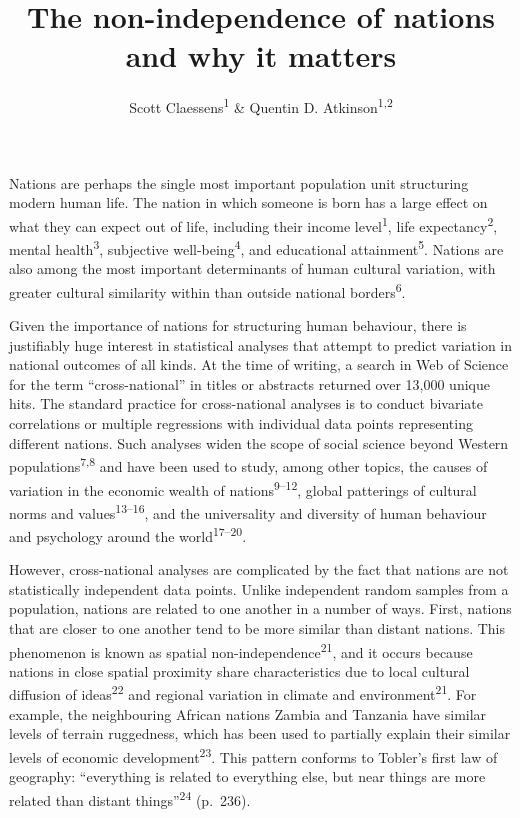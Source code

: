 \documentclass[
  man,floatsintext]{apa6}
\title{The non-independence of nations and why it matters}
\author{Scott Claessens\textsuperscript{1} \& Quentin D. Atkinson\textsuperscript{1,2}}
\date{}
\affiliation{\vspace{0.5cm}\textsuperscript{1} School of Psychology, University of Auckland, Auckland, New Zealand\\\textsuperscript{2} Max Planck Institute for Evolutionary Anthropology, Leipzig, Germany}
\begin{document}
\maketitle

Nations are perhaps the single most important population unit structuring modern human life. The nation in which someone is born has a large effect on what they can expect out of life, including their income level\textsuperscript{1}, life expectancy\textsuperscript{2}, mental health\textsuperscript{3}, subjective well-being\textsuperscript{4}, and educational attainment\textsuperscript{5}. Nations are also among the most important determinants of human cultural variation, with greater cultural similarity within than outside national borders\textsuperscript{6}.

Given the importance of nations for structuring human behaviour, there is justifiably huge interest in statistical analyses that attempt to predict variation in national outcomes of all kinds. At the time of writing, a search in Web of Science for the term ``cross-national'' in titles or abstracts returned over 13,000 unique hits. The standard practice for cross-national analyses is to conduct bivariate correlations or multiple regressions with individual data points representing different nations. Such analyses widen the scope of social science beyond Western populations\textsuperscript{7,8} and have been used to study, among other topics, the causes of variation in the economic wealth of nations\textsuperscript{9--12}, global patterings of cultural norms and values\textsuperscript{13--16}, and the universality and diversity of human behaviour and psychology around the world\textsuperscript{17--20}.

However, cross-national analyses are complicated by the fact that nations are not statistically independent data points. Unlike independent random samples from a population, nations are related to one another in a number of ways. First, nations that are closer to one another tend to be more similar than distant nations. This phenomenon is known as spatial non-independence\textsuperscript{21}, and it occurs because nations in close spatial proximity share characteristics due to local cultural diffusion of ideas\textsuperscript{22} and regional variation in climate and environment\textsuperscript{21}. For example, the neighbouring African nations Zambia and Tanzania have similar levels of terrain ruggedness, which has been used to partially explain their similar levels of economic development\textsuperscript{23}. This pattern conforms to Tobler's first law of geography: ``everything is related to everything else, but near things are more related than distant things''\textsuperscript{24} (p.~236).
\end{document}
